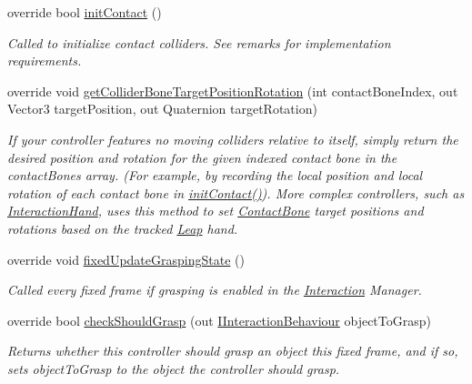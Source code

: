 \begin{DoxyCompactItemize}
override bool \mbox{\hyperlink{class_leap_1_1_unity_1_1_interaction_1_1_interaction_x_r_controller_a6646ebf671991c5bc47a66b2129538b6}{init\+Contact}} ()
\begin{DoxyCompactList}\small\item\em Called to initialize contact colliders. See remarks for implementation requirements. \end{DoxyCompactList}\item 
override void \mbox{\hyperlink{class_leap_1_1_unity_1_1_interaction_1_1_interaction_x_r_controller_a6870022c14d8cea42d36502b7a0a299f}{get\+Collider\+Bone\+Target\+Position\+Rotation}} (int contact\+Bone\+Index, out Vector3 target\+Position, out Quaternion target\+Rotation)
\begin{DoxyCompactList}\small\item\em If your controller features no moving colliders relative to itself, simply return the desired position and rotation for the given indexed contact bone in the contact\+Bones array. (For example, by recording the local position and local rotation of each contact bone in \mbox{\hyperlink{class_leap_1_1_unity_1_1_interaction_1_1_interaction_x_r_controller_a6646ebf671991c5bc47a66b2129538b6}{init\+Contact()}}). More complex controllers, such as \mbox{\hyperlink{class_leap_1_1_unity_1_1_interaction_1_1_interaction_hand}{Interaction\+Hand}}, uses this method to set \mbox{\hyperlink{class_leap_1_1_unity_1_1_interaction_1_1_contact_bone}{Contact\+Bone}} target positions and rotations based on the tracked \mbox{\hyperlink{namespace_leap_1_1_unity_1_1_leap}{Leap}} hand. \end{DoxyCompactList}\item 
override void \mbox{\hyperlink{class_leap_1_1_unity_1_1_interaction_1_1_interaction_x_r_controller_abbf181ce05807d75809cac14c0fa8a27}{fixed\+Update\+Grasping\+State}} ()
\begin{DoxyCompactList}\small\item\em Called every fixed frame if grasping is enabled in the \mbox{\hyperlink{namespace_leap_1_1_unity_1_1_interaction}{Interaction}} Manager. \end{DoxyCompactList}\item 
override bool \mbox{\hyperlink{class_leap_1_1_unity_1_1_interaction_1_1_interaction_x_r_controller_aad12f5a78dea6345158e44d87e17a5f6}{check\+Should\+Grasp}} (out \mbox{\hyperlink{interface_leap_1_1_unity_1_1_interaction_1_1_i_interaction_behaviour}{I\+Interaction\+Behaviour}} object\+To\+Grasp)
\begin{DoxyCompactList}\small\item\em Returns whether this controller should grasp an object this fixed frame, and if so, sets object\+To\+Grasp to the object the controller should grasp. \end{DoxyCompactList}\item 

\end{DoxyCompactItemize}
